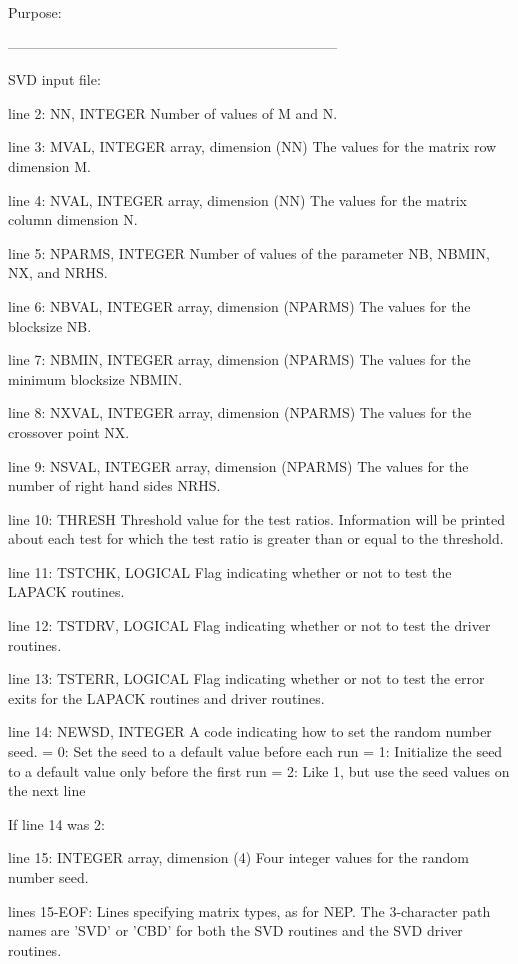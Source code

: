 \begin{DoxyParagraph}{Purpose\+: }
\begin{DoxyVerb}
-----------------------------------------------------------------------

 SVD input file:

 line 2:  NN, INTEGER
          Number of values of M and N.

 line 3:  MVAL, INTEGER array, dimension (NN)
          The values for the matrix row dimension M.

 line 4:  NVAL, INTEGER array, dimension (NN)
          The values for the matrix column dimension N.

 line 5:  NPARMS, INTEGER
          Number of values of the parameter NB, NBMIN, NX, and NRHS.

 line 6:  NBVAL, INTEGER array, dimension (NPARMS)
          The values for the blocksize NB.

 line 7:  NBMIN, INTEGER array, dimension (NPARMS)
          The values for the minimum blocksize NBMIN.

 line 8:  NXVAL, INTEGER array, dimension (NPARMS)
          The values for the crossover point NX.

 line 9:  NSVAL, INTEGER array, dimension (NPARMS)
          The values for the number of right hand sides NRHS.

 line 10: THRESH
          Threshold value for the test ratios.  Information will be
          printed about each test for which the test ratio is greater
          than or equal to the threshold.

 line 11: TSTCHK, LOGICAL
          Flag indicating whether or not to test the LAPACK routines.

 line 12: TSTDRV, LOGICAL
          Flag indicating whether or not to test the driver routines.

 line 13: TSTERR, LOGICAL
          Flag indicating whether or not to test the error exits for
          the LAPACK routines and driver routines.

 line 14: NEWSD, INTEGER
          A code indicating how to set the random number seed.
          = 0:  Set the seed to a default value before each run
          = 1:  Initialize the seed to a default value only before the
                first run
          = 2:  Like 1, but use the seed values on the next line

 If line 14 was 2:

 line 15: INTEGER array, dimension (4)
          Four integer values for the random number seed.

 lines 15-EOF:  Lines specifying matrix types, as for NEP.
          The 3-character path names are 'SVD' or 'CBD' for both the
          SVD routines and the SVD driver routines.


\end{DoxyVerb}
\end{DoxyParagraph}
